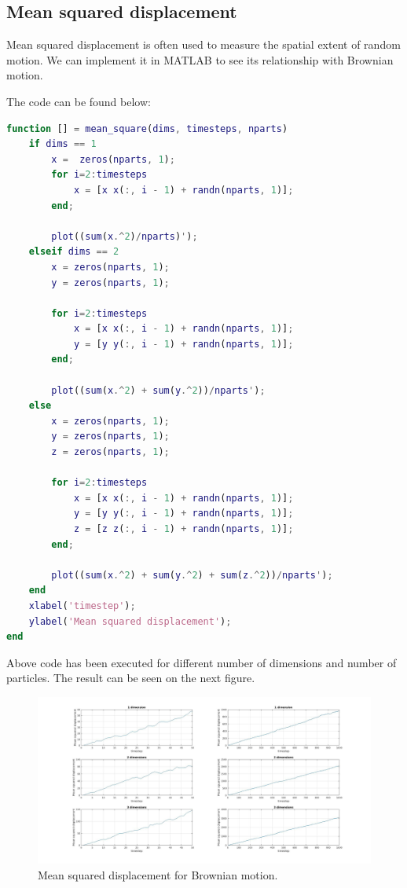\documentclass[12pt]{article}
\begin{document}
\subsection{Mean squared displacement}
Mean squared displacement is often used to measure the spatial extent of random motion. We can implement it in MATLAB to see its relationship with Brownian motion.

The code can be found below:

\begin{lstlisting}[language=Matlab, caption = {Source code for Mean squared displacement}]
function [] = mean_square(dims, timesteps, nparts)
	if dims == 1
		x =  zeros(nparts, 1);
		for i=2:timesteps
			x = [x x(:, i - 1) + randn(nparts, 1)];
		end;

		plot((sum(x.^2)/nparts)');
	elseif dims == 2
		x = zeros(nparts, 1);
		y = zeros(nparts, 1);

		for i=2:timesteps
			x = [x x(:, i - 1) + randn(nparts, 1)];
			y = [y y(:, i - 1) + randn(nparts, 1)];
		end;

		plot((sum(x.^2) + sum(y.^2))/nparts');
	else
		x = zeros(nparts, 1);
		y = zeros(nparts, 1);
		z = zeros(nparts, 1);

		for i=2:timesteps
			x = [x x(:, i - 1) + randn(nparts, 1)];
			y = [y y(:, i - 1) + randn(nparts, 1)];
			z = [z z(:, i - 1) + randn(nparts, 1)];
		end;

		plot((sum(x.^2) + sum(y.^2) + sum(z.^2))/nparts');
	end
	xlabel('timestep');
	ylabel('Mean squared displacement');
end
\end{lstlisting}

Above code has been executed for different number of dimensions and number of particles. The result can be seen on the next figure.

\begin{figure}[H]
	\centering
	\includegraphics[width=1.3\textwidth]{mean_squared}
	\caption{Mean squared displacement for Brownian motion.}
\end{figure}
\end{document}
